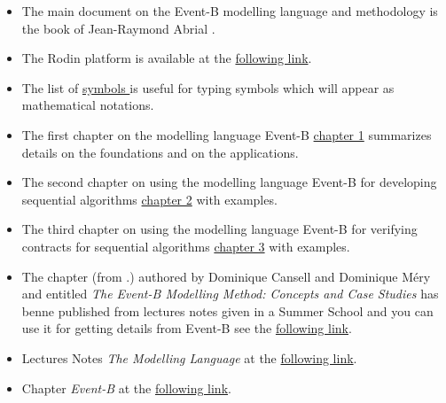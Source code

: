 \documentclass[ 12pt]{article}
\begin{document}
\begin{itemize}

\item[]  The main document on the Event-B  modelling language and
  methodology is the book of Jean-Raymond Abrial \cite{abrial2010}.

  
  
\item[]  The Rodin platform is available at the 
  \href{https://www.event-b.org/install.html}{following 
    link}.


  
\item[]  The list of 
  \href{http://mery54.github.io/teaching/mosos/lecturesnotes/symboles.pdf}{
    symbols } is useful for   typing symbols  which  will appear as 
  mathematical notations.



\item[]  The first chapter on the modelling language Event-B
  \href{http://mery54.github.io/teaching/mosos/lecturesnotes/main-C1.pdf}{chapter
  1} summarizes    details on the foundations and on the applications.


\item[]  The second  chapter on using the modelling language Event-B
  for developing sequential algorithms
  \href{http://mery54.github.io/teaching/mosos/lecturesnotes/main-C2.pdf}{chapter
  2}  with examples.



\item[]  The third  chapter on using the modelling language Event-B
  for verifying contracts for  sequential algorithms
  \href{http://mery54.github.io/teaching/mosos/lecturesnotes/main-fmt.pdf}{chapter
  3}  with examples.


  
\item[]  The chapter \cite{losl-b} (from \cite{losl-eatcs}.)  authored
  by Dominique Cansell and   Dominique Méry and entitled  \textit{The
    Event-B Modelling   Method: Concepts and Case        Studies} has
  benne published from lectures notes given in a Summer School and you can use it for
getting details from  Event-B   see  the  \href{http://mery54.github.io/teaching/mosos/lecturesnotes/BasicEventB.pdf}{following
  link}.

\item[]  Lectures Notes   \textit{The Modelling Language} at the 
  \href{http://mery54.github.io/teaching/mosos/lecturesnotes/main-Poly1.pdf}{following 
    link}.



  
\item[]  Chapter   \textit{Event-B} at the 
  \href{http://mery54.github.io/teaching/mosos/lecturesnotes/Chapter10.pdf}{following     link}.



  
\end{itemize}
\end{document}
